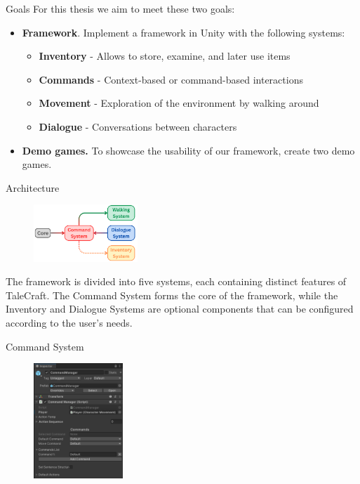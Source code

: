 \documentclass[portrait,a0paper,fontscale=0.34]{baposter}
\begin{document}
\begin{poster}
\begin{posterbox}[column=0, span=1, name=goals, below=background, headerColorOne=cyan!40, boxColorOne=cyan!10]{Goals}
For this thesis we aim to meet these two goals:
\begin{itemize}
\item \textbf{Framework}. Implement a framework in Unity with the following systems:
\begin{itemize}
    \item \textbf{Inventory} - Allows to store, examine, and later use items
    \item \textbf{Commands} - Context-based or command-based interactions
    \item \textbf{Movement} - Exploration of the environment by walking around
    \item \textbf{Dialogue} - Conversations between characters
\end{itemize}
\item \textbf{Demo games.} To showcase the usability of our framework, create two demo games.
\end{itemize}

\end{posterbox}

\begin{posterbox}[column=0, span=1, name=architecture, below=goals]{Architecture}

\begin{figure}
\centering
\includegraphics[width=0.35\textwidth]{img/framework.png}
\end{figure}
The framework is divided into five systems, each containing distinct features of TaleCraft. The Command System forms the core of the framework, while the Inventory and Dialogue Systems are optional components that can be configured according to the user's needs.
\begin{center}
\end{center}
\end{posterbox}

\begin{posterbox}[column=0, span=1, name=cs, below=architecture]{Command System}

\begin{figure}
\centering
\includegraphics[width=0.3\textwidth]{img/image_2025-07-08_214350710.png}
\end{figure}


\end{posterbox}
\end{poster}
\end{document}
